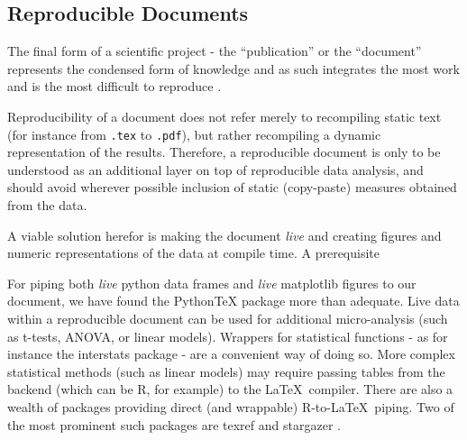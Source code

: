 	\subsection{Reproducible Documents}\label{sec:b_rd}
	    The final form of a scientific project - the “publication” or the “document” represents the condensed form of knowledge and as such integrates the most work and is the most difficult to reproduce \cite{Schwab2000}.
	    
	    Reproducibility of a document does not refer merely to recompiling static text (for instance from \colorbox{vlg}{\texttt{.tex}} to \colorbox{vlg}{\texttt{.pdf}}), but rather recompiling a dynamic representation of the results.
	    Therefore, a reproducible document is only to be understood as an additional layer on top of reproducible data analysis, and should avoid wherever possible inclusion of static (copy-paste) measures obtained from the data. 
	    
	    A viable solution herefor is making the document \textit{live} and creating figures and numeric representations of the data at compile time.
	    A prerequisite 
	    
	    
	    For piping both \textit{live} python data frames and \textit{live} matplotlib figures to our document, we have found the PythonTeX \cite{Poore2013} package more than adequate.
	    Live data within a reproducible document can be used for additional micro-analysis (such as t-tests, ANOVA, or linear models).
	    Wrappers for statistical functions - as for instance the interstats package \cite{interstats} - are a convenient way of doing so.
	    More complex statistical methods (such as linear models) may require passing tables from the backend (which can be R\cite{R}, for example) to the \LaTeX\ compiler.
	    There are also a wealth of packages providing direct (and wrappable) R-to-\LaTeX\ piping.
	    Two of the most prominent such packages are texref \cite{Leifeld2013} and stargazer \cite{Hlavac2013}.

